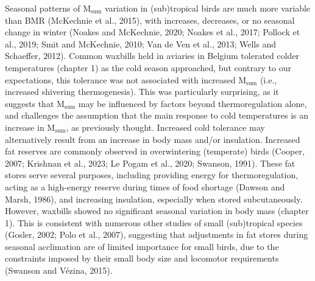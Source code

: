 \documentclass[10pt, twoside]{book} %
\begin{document}
Seasonal patterns of M$_{\text{sum}}$ variation in (sub)tropical birds are much more variable than BMR (McKechnie et al., 2015), with increases, decreases, or no seasonal change in winter (Noakes and McKechnie, 2020; Noakes et al., 2017; Pollock et al., 2019; Smit and McKechnie, 2010; Van de Ven et al., 2013; Wells and Schaeffer, 2012). Common waxbills held in aviaries in Belgium tolerated colder temperatures (chapter 1) as the cold season approached, but contrary to our expectations, this tolerance was not associated with increased M$_{\text{sum}}$ (i.e., increased shivering thermogenesis). This was particularly surprising, as it suggests that M$_{\text{sum}}$ may be influenced by factors beyond thermoregulation alone, and challenges the assumption that the main response to cold temperatures is an increase in M$_{\text{sum}}$, as previously thought. Increased cold tolerance may alternatively result from an increase in body mass and/or insulation. Increased fat reserves are commonly observed in overwintering (temperate) birds (Cooper, 2007; Krishnan et al., 2023; Le Pogam et al., 2020; Swanson, 1991). These fat stores serve several purposes, including providing energy for thermoregulation, acting as a high-energy reserve during times of food shortage (Dawson and Marsh, 1986), and increasing insulation, especially when stored subcutaneously. However, waxbills showed no significant seasonal variation in body mass (chapter 1). This is consistent with numerous other studies of small (sub)tropical species (Gosler, 2002; Polo et al., 2007), suggesting that adjustments in fat stores during seasonal acclimation are of limited importance for small birds, due to the constraints imposed by their small body size and locomotor requirements (Swanson and Vézina, 2015).\\
\end{document}
